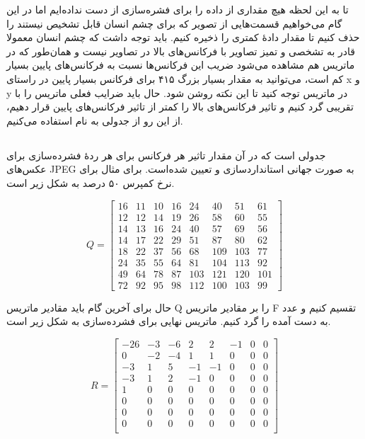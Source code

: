 تا به این لحظه هیچ مقداری از داده را برای فشره‌سازی از دست نداده‌ایم اما 
در این گام می‌خواهیم قسمت‌هایی از تصویر که برای چشم انسان قابل تشخیص نیستند
را حذف کنیم تا مقدار دادهٔ کمتری را ذخیره کنیم. 
باید توجه داشت که چشم انسان معمولا قادر به تشخصی و تمیز تصاویر با فرکانس‌های بالا در 
تصاویر نیست و همان‌طور که در ماتریس هم مشاهده می‌شود ضریب این فرکانس‌ها نسبت 
به فرکانس‌های پایین بسیار کم است، می‌توانید به مقدار بسیار بزرگ ۴۱۵ برای
فرکانس بسیار پایین در راستای x و y در ماتریس توجه کنید تا 
این نکته روشن شود. حال باید ضرایب فعلی ماتریس را با تقریبی گرد کنیم و تاثیر 
فرکانس‌های بالا را کمتر از تاثیر فرکانس‌های پایین قرار دهیم، از این رو 
از جدولی به نام
استفاده می‌کنیم. 

\subsection{}
جدولی است که در آن مقدار تاثیر هر فرکانس برای هر ردهٔ فشرده‌سازی 
برای عکس‌های JPEG به صورت جهانی استانداردسازی و تعیین شده‌است. 
برای مثال برای نرخ کمپرس ۵۰ درصد 
به شکل زیر است. 

\[
        Q = \begin{bmatrix}
                16 & 11 & 10 & 16 & 24 & 40 & 51 & 61\\
                12 & 12 & 14 & 19 & 26 & 58 & 60 & 55 \\
                14 & 13 & 16 & 24 & 40 & 57 & 69 & 56 \\
                14 & 17 & 22 & 29 & 51 & 87 & 80 & 62 \\
                18 & 22 & 37 & 56 & 68 & 109 & 103 & 77 \\
                24 & 35 & 55 & 64 & 81 & 104 & 113 & 92 \\
                49 & 64 & 78 & 87 & 103 & 121 & 120 & 101 \\
                72 & 92 & 95 & 98 & 112 & 100 & 103 & 99 

        \end{bmatrix}
\]

حال برای آخرین گام باید مقادیر ماتریس
Q 
را بر مقادیر ماتریس F 
تقسیم کنیم و عدد به دست آمده را گرد کنیم. ماتریس نهایی برای فشرده‌سازی به شکل زیر است.

\[
       R = \begin{bmatrix}
                -26 & -3 & -6 & 2 & 2 & -1 & 0 & 0\\
                0 & -2 & -4 & 1 & 1 & 0 & 0 & 0 \\
                -3 & 1 & 5 & -1 & -1 & 0 & 0 & 0 \\
                -3 & 1 & 2 & -1 & 0 & 0 & 0 & 0 \\
                1 & 0 & 0 & 0 & 0 & 0 & 0 & 0 \\
                0 & 0 & 0 & 0 & 0 & 0 & 0 & 0 \\
                0 & 0 & 0 & 0 & 0 & 0 & 0 & 0 \\
                0 & 0 & 0 & 0 & 0 & 0 & 0 & 0 \\

        \end{bmatrix}
\]

